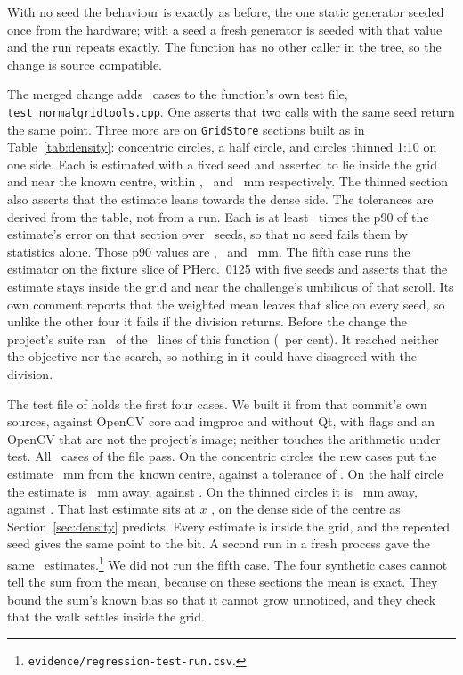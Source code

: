 With no seed the behaviour is exactly as before, the one static generator seeded once from the
hardware; with a seed a fresh generator is seeded with that value and the run repeats exactly. The
function has no other caller in the tree, so the change is source compatible.

The merged change adds \UpSquashTestCases\ cases to the function's own test file,
\texttt{test\_normalgridtools.cpp}. One asserts that two calls with the same seed return the same
point. Three more are on \texttt{GridStore} sections built as in Table~\ref{tab:density}:
concentric circles, a half circle, and circles thinned 1:10 on one side. Each is estimated with a
fixed seed and asserted to lie inside the grid and near the known centre, within
\RevTestTolCircleOne, \RevTestTolHalf\ and \RevTestTolDensTen~mm respectively. The thinned section
also asserts that the estimate leans towards the dense side. The tolerances are derived from the
table, not from a run. Each is at least \RevTestTolMinRatio\ times the p90 of the estimate's error
on that section over \RevDensSeeds\ seeds, so that no seed fails them by statistics alone. Those
p90 values are \RevDensCircleOneSumEstPNinetyMm, \RevDensHalfSumEstPNinetyMm\ and
\RevDensDensTenSumEstPNinetyMm~mm. The fifth case runs the estimator on the fixture slice of
PHerc.\ 0125 with five seeds and asserts that the estimate stays inside the grid and near the
challenge's umbilicus of that scroll. Its own comment reports that the weighted mean leaves that
slice on every seed, so unlike the other four it fails if the division returns. Before the change
the project's suite ran \RevCoverageRun\ of the \RevCoverageLines\ lines of this function
(\RevCoveragePct\ per cent). It reached neither the objective nor the search, so nothing in it
could have disagreed with the division.

The test file of \texttt{\RevTestSourcesCommit} holds the first four cases. We built it from
that commit's own sources, against OpenCV core and imgproc and without Qt,
with flags and an OpenCV that are not the project's image; neither touches the arithmetic under
test. All \RevTestCasesPassed\ cases of the file pass. On the concentric circles the new cases put
the estimate \RevTestRunCircleOneMm~mm from the known centre, against a tolerance of
\RevTestRunCircleOneTol. On the half circle the estimate is \RevTestRunHalfMm~mm away, against
\RevTestRunHalfTol. On the thinned circles it is \RevTestRunDensTenMm~mm away, against
\RevTestRunDensTenTol. That last estimate sits at $x$ \RevTestRunDensTenX, on the dense side of the
centre as Section~\ref{sec:density} predicts. Every estimate is inside the grid, and the repeated
seed gives the same point to the bit. A second run in a fresh process gave the same
\RevTestEstimatesPrinted\ estimates.\footnote{\texttt{evidence/regression-test-run.csv}.} We did not
run the fifth case. The four synthetic cases cannot tell the sum from the mean, because on these
sections the mean is exact. They bound the sum's known bias so that it cannot grow
unnoticed, and they check that the walk settles inside the grid.

